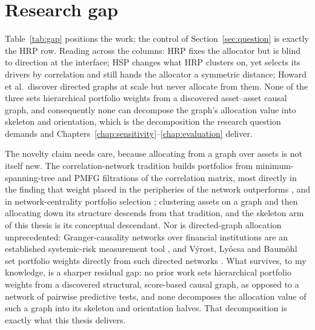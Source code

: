 \section{Research gap}
\label{sec:gap}

Table~\ref{tab:gap} positions the work; the \HRP{} control of
Section~\ref{sec:question} is exactly the HRP row. Reading across the
columns: HRP fixes the allocator but is blind to direction at the interface;
HSP changes what HRP clusters on, yet selects its drivers by correlation
and still hands the allocator a symmetric distance; Howard et al.\
discover directed graphs at scale but never allocate from them. None of
the three sets hierarchical portfolio weights from a discovered asset--asset
causal graph, and consequently none can decompose the graph's allocation
value into skeleton and orientation, which is the decomposition the research
question demands and
Chapters~\ref{chap:sensitivity}--\ref{chap:evaluation} deliver.

The novelty claim needs care, because allocating from a graph over assets is
not itself new. The correlation-network tradition builds portfolios from
minimum-spanning-tree and PMFG filtrations of the correlation matrix, most
directly in the finding that weight placed in the peripheries of the network
outperforms \cite{pozzi2013spread}, and in network-centrality portfolio
selection \cite{peralta2016network}; clustering assets on a graph and then
allocating down its structure descends from that tradition, and the skeleton
arm of this thesis is its conceptual descendant. Nor is directed-graph
allocation unprecedented: Granger-causality networks over financial
institutions are an established systemic-risk measurement tool
\cite{billio2012econometric}, and V\'yrost, Ly\'ocsa and Baum\"ohl set
portfolio weights directly from such directed networks \cite{vyrost2019network}.
What survives, to my knowledge, is a sharper residual gap: no prior work sets
hierarchical portfolio weights from a discovered structural, score-based
causal graph, as opposed to a network of pairwise predictive tests, and none
decomposes the allocation value of such a graph into its skeleton and
orientation halves. That decomposition is exactly what this thesis delivers.

